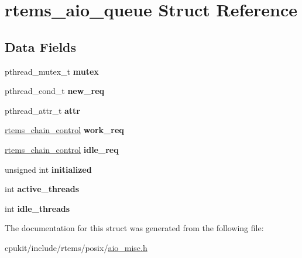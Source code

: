 \hypertarget{structrtems__aio__queue}{}\section{rtems\+\_\+aio\+\_\+queue Struct Reference}
\label{structrtems__aio__queue}
\subsection*{Data Fields}
\begin{DoxyCompactItemize}
\item 
\mbox{\label{structrtems__aio__queue_acf4c9be4d5f7e2729a1934c5168be044}} 
pthread\+\_\+mutex\+\_\+t {\bfseries mutex}
\item 
\mbox{\label{structrtems__aio__queue_a836d347a3d26a190760528ad81fc67fe}} 
pthread\+\_\+cond\+\_\+t {\bfseries new\+\_\+req}
\item 
\mbox{\label{structrtems__aio__queue_a999dadec8fea0bad329deaf9a1ca8fbf}} 
pthread\+\_\+attr\+\_\+t {\bfseries attr}
\item 
\mbox{\label{structrtems__aio__queue_a4777f4001679cc77105f4b81bdd7fd3b}} 
\mbox{\hyperlink{unionChain__Control}{rtems\+\_\+chain\+\_\+control}} {\bfseries work\+\_\+req}
\item 
\mbox{\label{structrtems__aio__queue_ab53193af39844b69471747c7d72d0968}} 
\mbox{\hyperlink{unionChain__Control}{rtems\+\_\+chain\+\_\+control}} {\bfseries idle\+\_\+req}
\item 
\mbox{\label{structrtems__aio__queue_ab92be34601d764537ac66511f8b877c9}} 
unsigned int {\bfseries initialized}
\item 
\mbox{\label{structrtems__aio__queue_a832c661ab5c9c0cdc34f08ba49880bde}} 
int {\bfseries active\+\_\+threads}
\item 
\mbox{\label{structrtems__aio__queue_a165535a851c63349fb42aa79f3fe69ad}} 
int {\bfseries idle\+\_\+threads}
\end{DoxyCompactItemize}


The documentation for this struct was generated from the following file\+:\begin{DoxyCompactItemize}
\item 
cpukit/include/rtems/posix/\mbox{\hyperlink{aio__misc_8h}{aio\+\_\+misc.\+h}}\end{DoxyCompactItemize}

